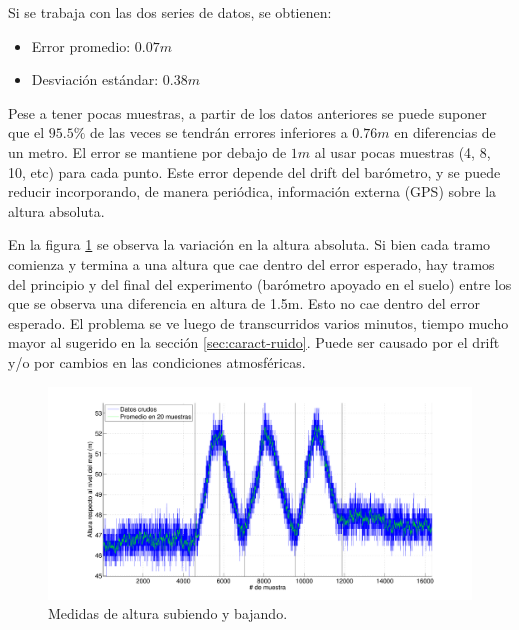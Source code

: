 \documentclass[main]{subfiles}
\begin{document}
Si se trabaja con las dos series de datos, se obtienen:

\begin{itemize}
\item Error promedio: $0.07m$
\item Desviaci\'on est\'andar: $0.38m$\\
\end{itemize}

Pese a tener pocas muestras, a partir de los datos anteriores se puede suponer que el $95.5 \%$ de las veces se tendr\'an errores inferiores a $0.76m$ en diferencias de un metro. El error se mantiene por debajo de $1m$ al usar pocas muestras (4, 8, 10, etc) para cada punto. Este error depende del drift del bar\'ometro, y se puede reducir incorporando, de manera peri\'odica, informaci\'on externa (GPS) sobre la altura absoluta.

En la figura \ref{fig:variando} se observa la variaci\'on en la altura absoluta. Si bien cada tramo comienza y termina a una altura que cae dentro del error esperado, hay tramos del principio y del final del experimento (bar\'ometro apoyado en el suelo) entre los que se observa una diferencia en altura de 1.5m. Esto no cae dentro del error esperado. El problema se ve luego de transcurridos varios minutos, tiempo mucho mayor al sugerido en la secci\'on \ref{sec:caract-ruido}. Puede ser causado por el drift y/o por cambios en las condiciones atmosf\'ericas.

\begin{figure}[H]
\hspace{-50pt}
  \includegraphics[width=1.2\textwidth]{./pics_barom/variando.pdf}
\vspace{-20pt}
  \caption{Medidas de altura subiendo y bajando.}
\vspace{-10pt}
  \label{fig:variando}
\end{figure}
\end{document}
